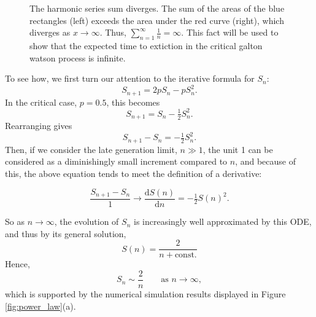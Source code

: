 \documentclass[11pt]{article}
\begin{document}
\begin{figure}[H]
\caption{The harmonic series sum diverges. The sum of the areas of the blue rectangles (left) exceeds the area under the red curve (right), which diverges as $x \to \infty$. Thus, $\sum_{n=1}^{\infty} \frac{1}{n} = \infty$. This fact will be used to show that the expected time to extiction in the critical galton watson process is infinite.}
\end{figure}


\noindent
To see how, we first turn our attention to the iterative formula for $S_n$:
\[
S_{n+1} = 2p S_n - p S_n^2.
\]
In the critical case, $p = 0.5$, this becomes
\[
S_{n+1} = S_n - \tfrac{1}{2} S_n^2.
\]
Rearranging gives
\[
S_{n+1} - S_n = -\tfrac{1}{2} S_n^2.
\]
Then, if we consider the late generation limit, $n \gg 1 $, the unit 1 can be considered as a diminishingly small increment compared to $n$, and because of this, the above equation tends to meet the definition of a derivative:

$$\frac{S_{n+1} - S_n}{1} \rightarrow \frac{\mathrm{d}S(n)}{\mathrm{d} n}  = -\tfrac{1}{2} S(n)^2.$$


\noindent
So as $n\to\infty$, the evolution of $S_n$ is increasingly well approximated by this ODE, and thus by its general solution, 
$$S(n) = \frac{2}{n + \text{const.}}$$
Hence, 
\begin{equation}
S_n \sim \frac{2}{n}
\qquad \text{as } n \to \infty, \label{twoovrn_sn}
\end{equation}
which is supported by the numerical simulation results displayed in Figure \ref{fig:power_law}(a).
\end{document}
